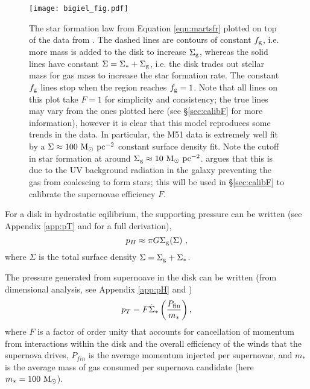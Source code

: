 \begin{figure}
    \centering
    \texttt{[image: bigiel\_fig.pdf]}
    \caption{The star formation law from Equation \ref{eqn:martsfr} plotted on top of the data from \citet{bigiel_star_2008}. The dashed lines are contours of constant $f_\mathrm{g}$, i.e. more mass is added to the disk to increase $\Sigma_\mathrm{g}$, whereas the solid lines have constant $\Sigma = \Sigma_* + \Sigma_\mathrm{g}$, i.e. the disk trades out stellar mass for gas mass to increase the star formation rate. The constant $f_\mathrm{g}$ lines stop when the region reaches $f_\mathrm{g}=1$. Note that all lines on this plot take $F=1$ for simplicity and consistency; the true lines may vary from the ones plotted here (see \S \ref{sec:calibF} for more information), however it is clear that this model reproduces some trends in the data. In particular, the M51 data is extremely well fit by a $\Sigma \approx 100 ~\mathrm{M}_{\odot} ~\mathrm{pc}^{-2}$ constant surface density fit. Note the cutoff in star formation at around $\Sigma_\mathrm{g} \approx 10 ~\mathrm{M}_{\odot} ~\mathrm{pc}^{-2}$. \citet{schaye_star_2004} argues that this is due to the UV background radiation in the galaxy preventing the gas from coalescing to form stars; this will be used in \S \ref{sec:calibF} to calibrate the supernovae efficiency $F$.}
    \label{fig:bigielwithmart}
\end{figure}

For a disk in hydrostatic eqilibrium, the supporting pressure can be written (see Appendix \ref{app:pT} and \citet{ostriker_maximally_2011} for a full derivation),
\begin{equation}
\label{eqn:hydeq}
p_H \approx \pi G \Sigma_\mathrm{g} (\Sigma)~,
\end{equation}
where $\Sigma$ is the total surface density $\Sigma = \Sigma_\mathrm{g} + \Sigma_*$.

The pressure generated from supernoave in the disk can be written (from dimensional analysis, see Appendix \ref{app:pH} and \citet{martizzi_supernova_2015})
\begin{equation}
\label{eqn:turb}
p_T = F \dot{\Sigma}_* \left(\frac{P_\mathrm{fin}}{m_*}\right),
\end{equation}
where $F$ is a factor of order unity that accounts for cancellation of momentum from interactions within the disk and the overall efficiency of the winds that the supernova drives, $P_{fin}$ is the average momentum injected per supernovae, and $m_*$ is the average mass of gas consumed per supernova candidate (here $m_* = 100 ~\mathrm{M}_{\odot}$).

